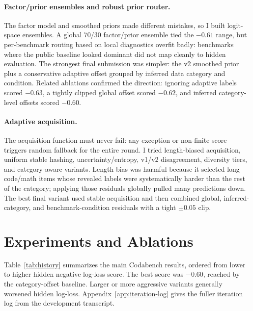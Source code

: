 \documentclass{article}
\begin{document}
\paragraph{Factor/prior ensembles and robust prior router.}
The factor model and smoothed priors made different mistakes, so I built logit-space ensembles. A global 70/30 factor/prior ensemble tied the $-0.61$ range, but per-benchmark routing based on local diagnostics overfit badly: benchmarks where the public baseline looked dominant did not map cleanly to hidden evaluation. The strongest final submission was simpler: the v2 smoothed prior plus a conservative adaptive offset grouped by inferred data category and condition. Related ablations confirmed the direction: ignoring adaptive labels scored $-0.63$, a tightly clipped global offset scored $-0.62$, and inferred category-level offsets scored $-0.60$.

\paragraph{Adaptive acquisition.}
The acquisition function must never fail: any exception or non-finite score triggers random fallback for the entire round. I tried length-biased acquisition, uniform stable hashing, uncertainty/entropy, v1/v2 disagreement, diversity tiers, and category-aware variants. Length bias was harmful because it selected long code/math items whose revealed labels were systematically harder than the rest of the category; applying those residuals globally pulled many predictions down. The best final variant used stable acquisition and then combined global, inferred-category, and benchmark-condition residuals with a tight $\pm 0.05$ clip.

\section{Experiments and Ablations}

Table~\ref{tab:history} summarizes the main Codabench results, ordered from lower to higher hidden negative log-loss score. The best score was $-0.60$, reached by the category-offset baseline. Larger or more aggressive variants generally worsened hidden log-loss. Appendix~\ref{app:iteration-log} gives the fuller iteration log from the development transcript.
\end{document}
